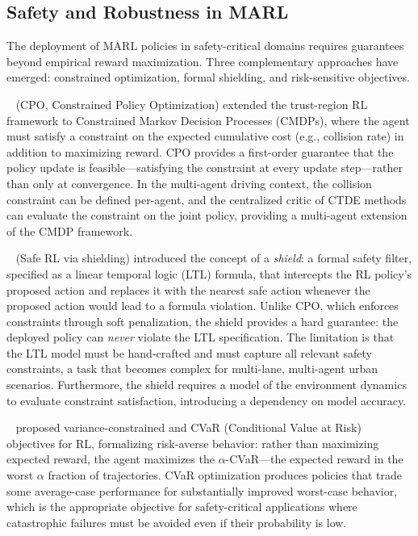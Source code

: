 \documentclass[12pt, a4paper]{article}
\begin{document}
\subsection{Safety and Robustness in MARL}
\label{sec:safety}

The deployment of MARL policies in safety-critical domains requires guarantees
beyond empirical reward maximization.  Three complementary approaches have
emerged: constrained optimization, formal shielding, and risk-sensitive
objectives.

\citeauthor{achiam2017constrained}~\cite{achiam2017constrained} (CPO,
Constrained Policy Optimization) extended the trust-region RL framework to
Constrained Markov Decision Processes (CMDPs), where the agent must satisfy
a constraint on the expected cumulative cost (e.g., collision rate) in addition
to maximizing reward.  CPO provides a first-order guarantee that the policy
update is feasible---satisfying the constraint at every update step---rather
than only at convergence.  In the multi-agent driving context, the collision
constraint can be defined per-agent, and the centralized critic of CTDE methods
can evaluate the constraint on the joint policy, providing a multi-agent
extension of the CMDP framework.

\citeauthor{alshiekh2018safe}~\cite{alshiekh2018safe} (Safe RL via shielding)
introduced the concept of a \emph{shield}: a formal safety filter, specified
as a linear temporal logic (LTL) formula, that intercepts the RL policy's
proposed action and replaces it with the nearest safe action whenever the
proposed action would lead to a formula violation.  Unlike CPO, which enforces
constraints through soft penalization, the shield provides a hard guarantee:
the deployed policy can \emph{never} violate the LTL specification.  The
limitation is that the LTL model must be hand-crafted and must capture all
relevant safety constraints, a task that becomes complex for multi-lane, multi-agent
urban scenarios.  Furthermore, the shield requires a model of the environment
dynamics to evaluate constraint satisfaction, introducing a dependency on
model accuracy.

\citeauthor{prashanth2016variance}~\cite{prashanth2016variance} proposed
variance-constrained and CVaR (Conditional Value at Risk) objectives for RL,
formalizing risk-averse behavior: rather than maximizing expected reward, the
agent maximizes the $\alpha$-CVaR---the expected reward in the worst $\alpha$
fraction of trajectories.  CVaR optimization produces policies that trade some
average-case performance for substantially improved worst-case behavior,
which is the appropriate objective for safety-critical applications where
catastrophic failures must be avoided even if their probability is low.
\end{document}
